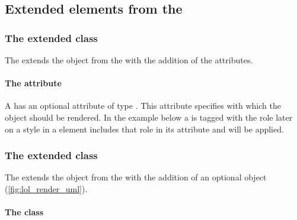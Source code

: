 

\subsection{Extended elements from the \LayoutPackage}


\subsubsection{The extended  class}
\label{graphicalobject-class}

The \RenderPackage extends the  object from the \LayoutPackage with the
addition of
the  attributes.

\paragraph{The \fixttspace{} attribute}


A \GraphicalObject has an optional attribute  of type
.  This attribute specifies with which \Style the object should be rendered. 
In the example below a \SpeciesGlyph is tagged with the role 
later on a style in a \GlobalRenderInformation element includes that role in its 
 attribute and will be applied.



\subsubsection{The extended  class}
\label{listoflayouts-class}

The \RenderPackage extends the  object from the \LayoutPackage with the
addition of an optional \ListOfGlobalRenderInformation object (\ref{fig:lol_render_uml}).

\paragraph{The  class}
\label{listofglobalrenderinformation-class}

